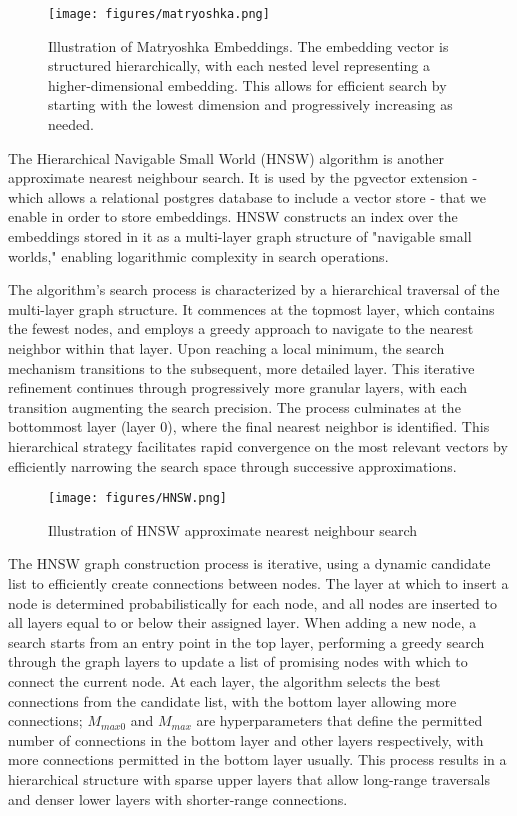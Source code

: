 \documentclass[a4paper, oneside]{discothesis}
\begin{document}
\begin{figure}[h]
\centering
\texttt{[image: figures/matryoshka.png]}
\caption{Illustration of Matryoshka Embeddings. The embedding vector is structured hierarchically, with each nested level representing a higher-dimensional embedding. This allows for efficient search by starting with the lowest dimension and progressively increasing as needed.}
\label{fig:matryoshka_embeddings}
\end{figure}

The Hierarchical Navigable Small World (HNSW) algorithm \cite{malkov2018efficient} is another approximate nearest neighbour search. It is used by the pgvector extension - which allows a relational postgres database to include a vector store - that we enable in order to store embeddings. HNSW constructs an index over the embeddings stored in it as a multi-layer graph structure of "navigable small worlds," enabling logarithmic complexity in search operations.

The algorithm's search process is characterized by a hierarchical traversal of the multi-layer graph structure. It commences at the topmost layer, which contains the fewest nodes, and employs a greedy approach to navigate to the nearest neighbor within that layer. Upon reaching a local minimum, the search mechanism transitions to the subsequent, more detailed layer. This iterative refinement continues through progressively more granular layers, with each transition augmenting the search precision. The process culminates at the bottommost layer (layer 0), where the final nearest neighbor is identified. This hierarchical strategy facilitates rapid convergence on the most relevant vectors by efficiently narrowing the search space through successive approximations.

\begin{figure}[h]
    \centering
    \texttt{[image: figures/HNSW.png]}
    \caption{Illustration of HNSW approximate nearest neighbour search}
    \label{fig:hnsw_structure}
    \end{figure}

The HNSW graph construction process is iterative, using a dynamic candidate list to efficiently create connections between nodes. The layer at which to insert a node is determined probabilistically for each node, and all nodes are inserted to all layers equal to or below their assigned layer. When adding a new node, a search starts from an entry point in the top layer, performing a greedy search through the graph layers to update a list of promising nodes with which to connect the current node. At each layer, the algorithm selects the best connections from the candidate list, with the bottom layer allowing more connections; $M_{max0}$ and $M_{max}$ are hyperparameters that define the permitted number of connections in the bottom layer and other layers respectively, with more connections permitted in the bottom layer usually. This process results in a hierarchical structure with sparse upper layers that allow long-range traversals and denser lower layers with shorter-range connections.
\end{document}
